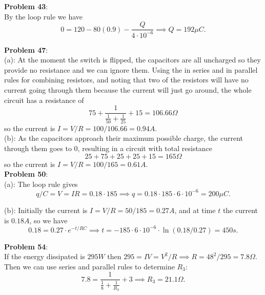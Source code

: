 \documentclass{amsart}
\begin{document}
	\textbf{Problem 43}:\\
	
	By the loop rule we have
	$$
	0 = 120 - 80(0.9) - \frac{Q}{4\cdot 10^{-6}} \implies Q = 192 \mu C.
	$$
	
	\textbf{Problem 47}:\\
	
	(a): At the moment the switch is flipped, the capacitors are all uncharged so they provide no resistance and we can ignore them. Using the in series and in parallel rules for combining resistors, and noting that two of the resistors will have no current going through them because the current will just go around, the whole circuit has a resistance of 
	$$
	75 + \frac{1}{\frac{1}{50}+\frac{1}{25}} + 15 = 106.66 \Omega
	$$
	so the current is $I=V/R = 100/106.66 = 0.94 A$.\\
	
	(b): As the capacitors approach their maximum possible charge, the current through them goes to 0, resulting in a circuit with total resistance
	$$
	25 + 75 + 25 + 25 + 15 = 165 \Omega 
	$$
	so the current is $I=V/R = 100/165 = 0.61 A$.\\
	
	\textbf{Problem 50}:\\
	
	(a): The loop rule gives 
	$$q/C = V = IR = 0.18 \cdot 185 \implies q = 0.18 \cdot 185 \cdot 6 \cdot 10^{-6} = 200 \mu C.$$ 
	
	(b): Initially the current is $I=V/R = 50/185 = 0.27 A$, and at time $t$ the current is $0.18 A$, so we have $$0.18 = 0.27 \cdot e^{-t/RC} \implies t = -185\cdot 6 \cdot 10^{-6} \cdot \ln(0.18/0.27) = 450 s.$$
	
	\textbf{Problem 54}:\\
	
	If the energy dissipated is $295 W$ then $295 = IV = V^2/R \implies R = 48^2/295 = 7.8 \Omega$. Then we can use series and parallel rules to determine $R_3$:
	$$
	7.8 = \frac{1}{\frac{1}{8}+\frac{1}{R_3}} + 3 \implies R_3 = 21.1 \Omega.
	$$
\end{document}
